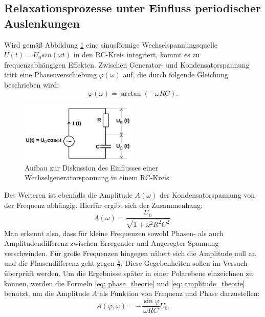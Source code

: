 \subsection{Relaxationsprozesse unter Einfluss periodischer Auslenkungen}
Wird gemäß Abbildung \ref{fig: aufbau_2} eine sinusförmige Wechselspannungsquelle $U(t) = U_0sin(\omega t)$ in den RC-Kreis integriert, kommt es zu frequenzabhängigen
Effekten. Zwischen Generator- und Kondensatorspannung tritt eine Phasenverschiebung $\varphi(\omega)$ auf, die durch folgende Gleichung
beschrieben wird:
\begin{equation}
  \varphi(\omega) = \arctan(-\omega RC).
  \label{eq: phase_theorie}
\end{equation}
\FloatBarrier
\begin{figure}
  \centering
\includegraphics[width = 0.5\textwidth]{pics/aufbau_2.png}
\caption{Aufbau zur Diskussion des Einflusses einer Wechselgeneratorspannung in einem RC-Kreis\cite{anleitung353}. }
\label{fig: aufbau_2}
\end{figure}
Des Weiteren ist ebenfalls die Amplitude $A(\omega)$ der Kondensatorspannung von der Frequenz abhängig. Hierfür ergibt sich der Zusammenhang:
\begin{equation}
  A(\omega) = \frac{U_0}{\sqrt{1 +\omega^2R^2C^2}}.
  \label{eq: amplitude_theorie}
\end{equation}
Man erkennt also, dass für kleine Frequenzen sowohl Phasen- als auch Amplitudendifferenz zwischen Erregender und Angeregter Spannung verschwinden.
Für große Frequenzen hingegen nähert sich die Amplitude null an und die Phasendifferenz geht gegen $\frac{\pi}{2}$. Diese Gegebenheiten sollen
im Versuch überprüft werden. Um die Ergebnisse später in einer Polarebene einzeichnen zu können, werden die Formeln \eqref{eq: phase_theorie} und
\eqref{eq: amplitude_theorie} benutzt, um die Amplitude $A$ als Funktion von Frequenz und Phase darzustellen:
\begin{equation}
  A(\varphi, \omega) = -\frac{\sin{\varphi}}{\omega R C}U_0.
\end{equation}

